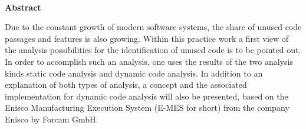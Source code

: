 
~

\vspace{17.1mm}

\begin{flushleft}
    \textbf{\huge{}Abstract}{\huge\par}
\par\end{flushleft}

Due to the constant growth of modern software systems, the share of unused code passages and features is also growing. Within this practice work a first view of the analysis possibilities for the identification of unused code is to be pointed out. In order to accomplish such an analysis, one uses the results of the two analysis kinds \glqq static code analysis\grqq{} and \glqq dynamic code analysis\grqq{}. In addition to an explanation of both types of analysis, a concept and the associated implementation for dynamic code analysis will also be presented, based on the Enisco Manufacturing Execution System (E-MES for short) from the company Enisco by Forcam GmbH.

